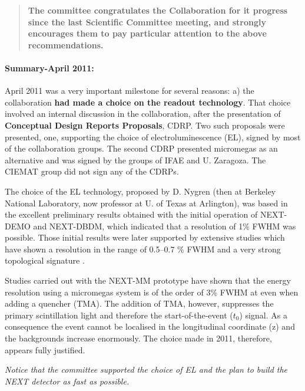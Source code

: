 \begin{quotation}
{\bf The committee congratulates the Collaboration for it progress since the last Scientific Committee meeting, and strongly encourages them to pay particular attention to the above recommendations. }

\end{quotation}

\paragraph{Summary-April 2011:} April 2011 was a very important milestone for several reasons: a) the collaboration 
{\bf had made a choice on the readout technology}. That choice involved an internal discussion in the collaboration, after the presentation of {\bf Conceptual Design Reports Proposals}, CDRP. Two such proposals were presented, one, supporting the choice of electroluminescence (EL), signed by most of the collaboration groups. The second CDRP presented micromegas as an alternative and was signed by the groups of IFAE and U. Zaragoza. The CIEMAT group did not sign any of the CDRPs.

The choice of the EL technology, proposed by D. Nygren (then at Berkeley National Laboratory, now professor at U. of Texas at Arlington), was based in the excellent preliminary results obtained with the initial operation of NEXT-DEMO and NEXT-DBDM, which indicated that a resolution of 1\% FWHM was possible. Those initial results were later supported by extensive studies which have shown a resolution in the range of 0.5--0.7 \% FWHM  \cite{Alvarez:2012yxw, Alvarez:2012zsz,Alvarez:2012hu,Alvarez:2013gxa,Lorca:2014sram,Renner:2014mha,Serra:2014zda} and a very strong topological signature  \cite{Ferrario:2015kta}. 

Studies carried out with the NEXT-MM prototype have shown that the energy resolution using a micromegas system is of the order of
3\% FWHM at \Qbb \cite{Alvarez:2013oha,Alvarez:2013kqa} even when adding a quencher (TMA). The addition of TMA, however,  suppresses the primary scintillation light and therefore the start-of-the-event ($t_0$) signal. As a consequence the event cannot be localised in the longitudinal coordinate (z) and the backgrounds increase enormously. The choice made in 2011, therefore, appears fully justified. 

{\em Notice that the committee supported the choice of EL and the plan to build the NEXT detector as fast as possible.}





